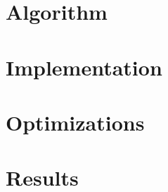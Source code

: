 


  \begin{frame}[plain]
  \titlepage
  \end{frame}
  \section{Algorithm}
  \setcounter{subsection}{1}
  
  \section{Implementation}
  \setcounter{subsection}{1}
  
  \section{Optimizations}
  \setcounter{subsection}{1}
  
  \section{Results}
  \setcounter{subsection}{1}
  
